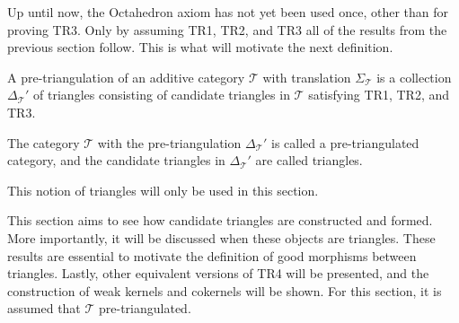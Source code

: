     Up until now, the Octahedron axiom has not yet been used once, other than for proving TR3. Only by assuming TR1, TR2, and TR3 all of the results from the previous section follow. This is what will motivate the next definition.

    \begin{definition}
        A pre-triangulation of an additive category $\mathcal{T}$ with translation $\Sigma_{\mathcal{T}}$ is a collection $\Delta_{\mathcal{T}}'$ of triangles consisting of candidate triangles in $\mathcal{T}$ satisfying TR1, TR2, and TR3.

        The category $\mathcal{T}$ with the pre-triangulation $\Delta_{\mathcal{T}}'$ is called a pre-triangulated category, and the candidate triangles in $\Delta_{\mathcal{T}}'$ are called  triangles.
    \end{definition}

    \begin{remark}
        This notion of triangles will only be used in this section.
    \end{remark}

    This section aims to see how candidate triangles are constructed and formed. More importantly, it will be discussed when these objects are triangles. These results are essential to motivate the definition of good morphisms between triangles. Lastly, other equivalent versions of TR4 will be presented, and the construction of weak kernels and cokernels will be shown. For this section, it is assumed that $\mathcal{T}$ pre-triangulated.

